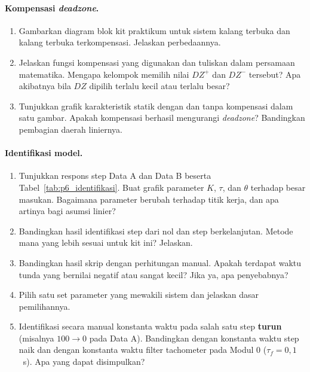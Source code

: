 \documentclass[11pt,a4paper]{article}
\begin{document}
\paragraph{Kompensasi \textit{deadzone}.}
\begin{enumerate}[resume]
	\item Gambarkan diagram blok kit praktikum untuk sistem kalang terbuka dan kalang terbuka terkompensasi. Jelaskan perbedaannya.
	\item Jelaskan fungsi kompensasi yang digunakan dan tuliskan dalam persamaan matematika. Mengapa kelompok memilih nilai $DZ^{+}$ dan $DZ^{-}$ tersebut? Apa akibatnya bila $DZ$ dipilih terlalu kecil atau terlalu besar?
	\item Tunjukkan grafik karakteristik statik dengan dan tanpa kompensasi dalam satu gambar. Apakah kompensasi berhasil mengurangi \textit{deadzone}? Bandingkan pembagian daerah liniernya.
\end{enumerate}

\paragraph{Identifikasi model.}
\begin{enumerate}[resume]
	\item Tunjukkan respons step Data A dan Data B beserta Tabel~\ref{tab:p6_identifikasi}. Buat grafik parameter $K$, $\tau$, dan $\theta$ terhadap besar masukan. Bagaimana parameter berubah terhadap titik kerja, dan apa artinya bagi asumsi linier?
	\item Bandingkan hasil identifikasi step dari nol dan step berkelanjutan. Metode mana yang lebih sesuai untuk kit ini? Jelaskan.
	\item Bandingkan hasil skrip dengan perhitungan manual. Apakah terdapat waktu tunda yang bernilai negatif atau sangat kecil? Jika ya, apa penyebabnya?
	\item Pilih satu set parameter yang mewakili sistem dan jelaskan dasar pemilihannya.
	\item Identifikasi secara manual konstanta waktu pada salah satu step \textbf{turun} (misalnya $100 \rightarrow 0$ pada Data A). Bandingkan dengan konstanta waktu step naik dan dengan konstanta waktu filter tachometer pada Modul 0 ($\tau_f = 0{,}1$~s). Apa yang dapat disimpulkan?
\end{enumerate}
\end{document}
